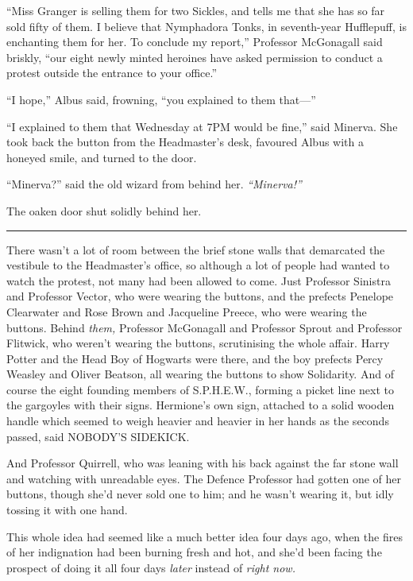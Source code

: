 ``Miss Granger is selling them for two Sickles, and tells me that she
has so far sold fifty of them. I believe that Nymphadora Tonks, in
seventh-year Hufflepuff, is enchanting them for her. To conclude my
report,'' Professor McGonagall said briskly, ``our eight newly minted
heroines have asked permission to conduct a protest outside the entrance
to your office.''

``I hope,'' Albus said, frowning, ``you explained to them that---''

``I explained to them that Wednesday at 7PM would be fine,'' said
Minerva. She took back the button from the Headmaster's desk, favoured
Albus with a honeyed smile, and turned to the door.

``Minerva?'' said the old wizard from behind her. \emph{``Minerva!''}

The oaken door shut solidly behind her.

\begin{center}\rule{3in}{0.4pt}\end{center}

There wasn't a lot of room between the brief stone walls that demarcated
the vestibule to the Headmaster's office, so although a lot of people
had wanted to watch the protest, not many had been allowed to come. Just
Professor Sinistra and Professor Vector, who were wearing the buttons,
and the prefects Penelope Clearwater and Rose Brown and Jacqueline
Preece, who were wearing the buttons. Behind \emph{them,} Professor
McGonagall and Professor Sprout and Professor Flitwick, who weren't
wearing the buttons, scrutinising the whole affair. Harry Potter and the
Head Boy of Hogwarts were there, and the boy prefects Percy Weasley and
Oliver Beatson, all wearing the buttons to show Solidarity. And of
course the eight founding members of S.P.H.E.W., forming a picket line
next to the gargoyles with their signs. Hermione's own sign, attached to
a solid wooden handle which seemed to weigh heavier and heavier in her
hands as the seconds passed, said NOBODY'S SIDEKICK.

And Professor Quirrell, who was leaning with his back against the far
stone wall and watching with unreadable eyes. The Defence Professor had
gotten one of her buttons, though she'd never sold one to him; and he
wasn't wearing it, but idly tossing it with one hand.

This whole idea had seemed like a much better idea four days ago, when
the fires of her indignation had been burning fresh and hot, and she'd
been facing the prospect of doing it all four days \emph{later} instead
of \emph{right now.}

